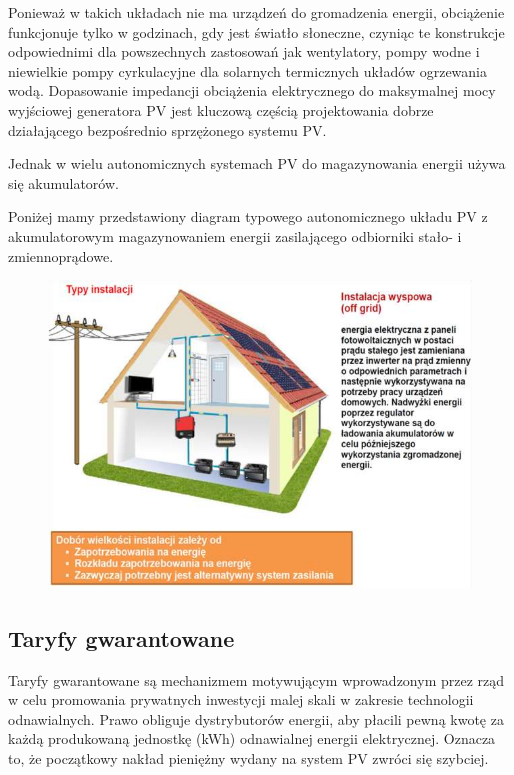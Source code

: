 \documentclass[12pt,a4paper]{article}
\begin{document}
Ponieważ w takich układach nie ma urządzeń do gromadzenia energii, 
obciążenie funkcjonuje tylko w godzinach, gdy jest światło słoneczne, 
czyniąc te konstrukcje odpowiednimi dla powszechnych zastosowań jak 
wentylatory, pompy wodne i niewielkie pompy cyrkulacyjne dla solarnych 
termicznych układów ogrzewania wodą. Dopasowanie impedancji obciążenia 
elektrycznego do maksymalnej mocy wyjściowej generatora PV jest kluczową 
częścią projektowania dobrze działającego bezpośrednio sprzężonego 
systemu PV. 

Jednak w wielu autonomicznych systemach PV do magazynowania energii 
używa się akumulatorów. 

Poniżej mamy przedstawiony diagram typowego autonomicznego układu PV z 
akumulatorowym magazynowaniem energii zasilającego odbiorniki stało- i 
zmiennoprądowe. 

\begin{figure}[h]
\centering
\includegraphics[natwidth=16.60cm,natheight=12.13cm]{media/image4.png}
\end{figure}

\subsection{Taryfy gwarantowane}

Taryfy gwarantowane są mechanizmem motywującym wprowadzonym przez rząd w 
celu promowania prywatnych inwestycji malej skali w zakresie technologii 
odnawialnych. Prawo obliguje dystrybutorów energii, aby płacili pewną 
kwotę za każdą produkowaną jednostkę (kWh) odnawialnej energii 
elektrycznej. Oznacza to, że początkowy nakład pieniężny wydany na 
system PV zwróci się szybciej. 
\end{document}
